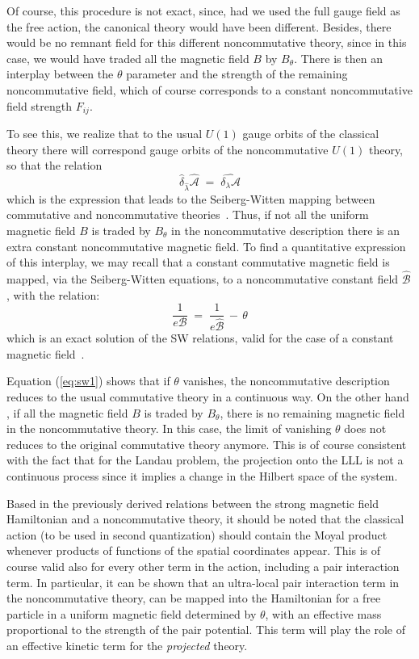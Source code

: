 \documentclass[a4paper,12pt]{article}
\begin{document}
Of course, this procedure is not exact, since, had we used the full
gauge field as the free action, the canonical theory would have
been
different.  Besides, there would be no remnant field for this
different noncommutative theory, since in this case, we would have
traded all the magnetic field $B$ by $B_\theta$.  There is then an
interplay between the $\theta$ parameter and the strength of the
remaining
noncommutative field, which of course corresponds to a constant
noncommutative field strength $F_{ij}$.

To see this, we realize that to the usual $U(1)$ gauge orbits of
the
classical theory there will correspond gauge orbits of the
noncommutative $U(1)$ theory, so that the relation
\begin{equation}
  \label{eq:sw}
{\hat{\delta}}_{\hat{\lambda}}{\widehat{\mathcal A}} \;=\; 
\widehat{\delta_\lambda {\mathcal A}}
\end{equation}
which is the expression that leads to the Seiberg-Witten mapping
between commutative and noncommutative theories~\cite{SW}.  Thus,
if
not all the uniform magnetic field $B$ is traded by $B_\theta$ in
the
noncommutative description there is an extra constant
noncommutative
magnetic field.  To find a quantitative expression of this
interplay,
we may recall that a constant commutative magnetic field is mapped,
via the Seiberg-Witten equations, to a noncommutative constant
field
${\widehat{\mathcal B}}$, with the relation:
\begin{equation}
  \label{eq:sw1}
\frac{1}{e {\mathcal B}} \;=\; \frac{1}{e {\hat{\mathcal B}}} \,-\,
\theta 
\end{equation}
which is an exact solution of the SW relations, valid for the case
of
a constant magnetic field~\cite{SW}.

Equation (\ref{eq:sw1}) shows that if $\theta$ vanishes, the
noncommutative
description reduces to the usual commutative theory in a continuous
way. On the other hand , if all the magnetic field $B$ is traded by
$B_\theta$, there is no remaining magnetic field in the
noncommutative
theory. In this case, the limit of vanishing $\theta$ does not
reduces to
the original commutative theory anymore. This is of course
consistent
with the fact that for the Landau problem, the projection onto the
LLL
is not a continuous process since it implies a change in the
Hilbert
space of the system.
     

Based in the previously derived relations between the strong
magnetic
field Hamiltonian and a noncommutative theory, it should be noted
that
the classical action (to be used in second quantization) should
contain the Moyal product whenever products of functions of the
spatial coordinates appear. This is of course valid also for every
other term in the action, including a pair interaction term.  In
particular, it can be shown that an ultra-local pair interaction
term
in the noncommutative theory, can be mapped into the Hamiltonian
for a
free particle in a uniform magnetic field determined by $\theta$,
with an
effective mass proportional to the strength of the pair potential.
This term will play the role of an effective kinetic term for the
{\it
  projected\/} theory.
\end{document}
